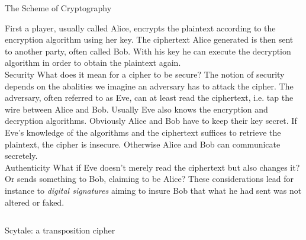 \documentclass[final,hyperref={pdfpagelabels=false}]{beamer}
\newcommand{\gearmacro}[5]{%
    \foreach \i in {1,...,#1} {%
      [rotate=(\i-1)*360/#1]  (0:#2)  arc (0:#4:#2) {[rounded corners=1.5pt]
        -- (#4+#5:#3)  arc (#4+#5:360/#1-#5:#3)} --  (360/#1:#2)
    }}
\begin{document}
\begin{frame}{}
\begin{columns}[t]
\begin{column}{.65\linewidth}
\begin{alertblock}{The Scheme of Cryptography}
\begin{figure}
    \end{figure}
    First a player, usually called Alice, encrypts the plaintext according to the encryption algorithm using her key. The ciphertext Alice generated is then sent to another party, often called Bob. With his key he can execute the decryption algorithm in order to obtain the plaintext again. \\
    \alert{Security} 
      What does it mean for a cipher to be secure? The notion of security depends on the abalities we imagine an adversary has to attack the cipher. The adversary, often referred to as Eve, can at least read the ciphertext, i.e. tap the wire between Alice and Bob. Usually Eve also knows the encryption and decryption algorithms. Obviously Alice and Bob have to keep their key secret. If Eve's knowledge of the algorithms and the ciphertext suffices to retrieve the plaintext, the cipher is insecure. Otherwise Alice and Bob can communicate secretely. \\
    \alert{Authenticity} 
      What if Eve doesn't merely read the ciphertext but also changes it? Or sends something to Bob, claiming to be Alice? These considerations lead for instance to {\em digital signatures} aiming to insure Bob that what he had sent was not altered or faked.
    \end{alertblock}
    \end{column}
    \end{columns}
    \vfill
    \begin{columns}[t]
    \begin{column}{.32\linewidth}
        \begin{block}{Scytale: a transposition cipher}

\end{block}
\end{column}
\end{columns}
\end{frame}
\end{document}
